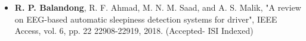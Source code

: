 \renewcommand\listtablename{\normalsize\normalfont\centering\vspace*{-0.5 in} LIST OF PUBLICATIONST}
\iftablespage
{}
{}

\begin{itemize}[leftmargin=*]
	\item\textbf{ R. P. Balandong}, R. F. Ahmad, M. N. M. Saad, and A. S. Malik, "A review on EEG-based automatic sleepiness detection systems for driver", IEEE Access, vol. 6, pp. 22 22908-22919, 2018. (Accepted- ISI Indexed)
\end{itemize}

\clearpage


%	

%
%





